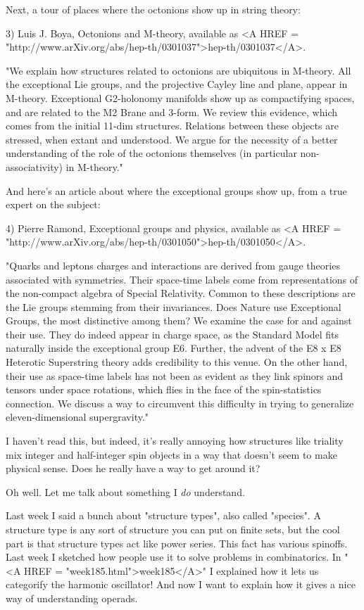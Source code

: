 Next, a tour of places where the octonions show up in string 
theory:

3) Luis J. Boya, Octonions and M-theory, available as <A HREF =
"http://www.arXiv.org/abs/hep-th/0301037">hep-th/0301037</A>.

"We explain how structures related to octonions are ubiquitous in 
M-theory.  All the exceptional Lie groups, and the projective Cayley 
line and plane, appear in M-theory.  Exceptional G2-holonomy manifolds 
show up as compactifying spaces, and are related to the M2 Brane and 
3-form.  We review this evidence, which comes from the initial 11-dim 
structures.  Relations between these objects are stressed, when extant 
and understood.  We argue for the necessity of a better understanding of 
the role of the octonions themselves (in particular non-associativity) 
in M-theory." 

And here's an article about where the exceptional groups show up,
from a true expert on the subject:

4) Pierre Ramond, Exceptional groups and physics, available as
<A HREF = "http://www.arXiv.org/abs/hep-th/0301050">hep-th/0301050</A>. 

"Quarks and leptons charges and interactions are derived from gauge 
theories associated with symmetries.  Their space-time labels come 
from representations of the non-compact algebra of Special Relativity. 
Common to these descriptions are the Lie groups stemming from their 
invariances.  Does Nature use Exceptional Groups, the most distinctive 
among them?  We examine the case for and against their use.  They do 
indeed appear in charge space, as the Standard Model fits naturally 
inside the exceptional group E6.  Further, the advent of the E8 x E8 
Heterotic Superstring theory adds credibility to this venue.  On
the other hand, their use as space-time labels has not been as evident 
as they link spinors and tensors under space rotations, which flies 
in the face of the spin-statistics connection.  We discuss a way to 
circumvent this difficulty in trying to generalize eleven-dimensional 
supergravity."

I haven't read this, but indeed, it's really annoying how structures
like triality mix integer and half-integer spin objects in a way that
doesn't seem to make physical sense.  Does he really have a way to get
around it?

Oh well.  Let me talk about something I \emph{do} understand.


Last week I said a bunch about "structure types", also called
"species".  A structure type is any sort of structure you can
put on finite sets, but the cool part is that structure types act like
power series.  This fact has various spinoffs.  Last week I sketched how
people use it to solve problems in combinatorics.  In "<A HREF =
"week185.html">week185</A>" I explained how it lets us categorify
the harmonic oscillator!  And now I want to explain how it gives a nice
way of understanding operads.

